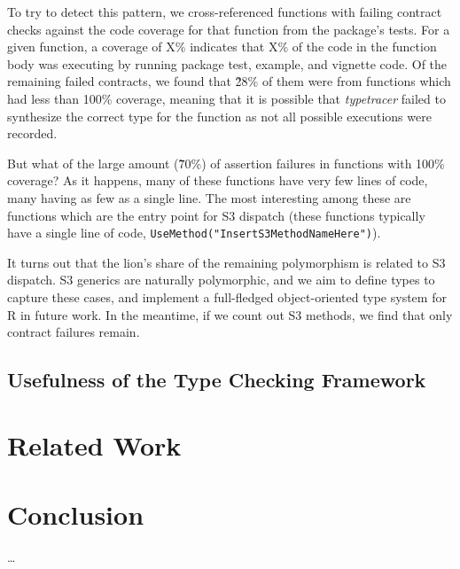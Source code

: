 \documentclass[acmsmall,review,anonymous]{acmart}\settopmatter{printfolios=true,printccs=false,printacmref=false}
\newcommand{\code}[1]{{\lstinline[style=Rin]!#1!}\xspace}
\newcommand{\typetracer}{\emph{typetracer}\xspace} %
\begin{document}
To try to detect this pattern, we cross-referenced functions with failing contract checks against the code coverage for that function from the package's tests.
For a given function, a coverage of X\% indicates that X\% of the code in the function body was executing by running package test, example, and vignette code.
Of the remaining failed contracts, we found that \~28\% of them were from functions which had less than 100\% coverage, meaning that it is possible that \typetracer failed to synthesize the correct type for the function as not all possible executions were recorded.

But what of the large amount (\~70\%) of assertion failures in functions with 100\% coverage?
As it happens, many of these functions have very few lines of code, many having as few as a single line.
The most interesting among these are functions which are the entry point for S3 dispatch (these functions typically have a single line of code, \code{UseMethod("InsertS3MethodNameHere")}).

It turns out that the lion's share of the remaining polymorphism is related to S3 dispatch.
S3 generics are naturally polymorphic, and we aim to define types to capture these cases, and implement a full-fledged object-oriented type system for R in future work.
In the meantime, if we count out S3 methods, we find that only  contract failures remain.

%
%
%
%
\subsection{Usefulness of the Type Checking Framework}


%
%
%
%
%
%
\section{Related Work}
\label{sec:relatedwork}


%
%
%
%
%
%
\section{Conclusion}

\ldots
\end{document}
